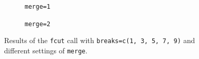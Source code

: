 \documentclass[review]{elsarticle}
\newcommand{\code}[1]{\texttt{#1}}
\begin{document}
\begin{figure}[ht]
    \centering
    \newsavebox{\largestimage}
    \begin{subfigure}[b]{0.49\textwidth}
        \centering
        \usebox{\largestimage}
        \caption{\code{merge=1}}
    \end{subfigure}
    \begin{subfigure}[b]{0.49\textwidth}
        \centering
        \caption{\code{merge=2}}
    \end{subfigure}
    \caption{Results of the \code{fcut} call with \code{breaks=c(1, 3, 5, 7, 9)} and different settings of \code{merge}.}
    \label{fig:fcut}
\end{figure}
\end{document}
